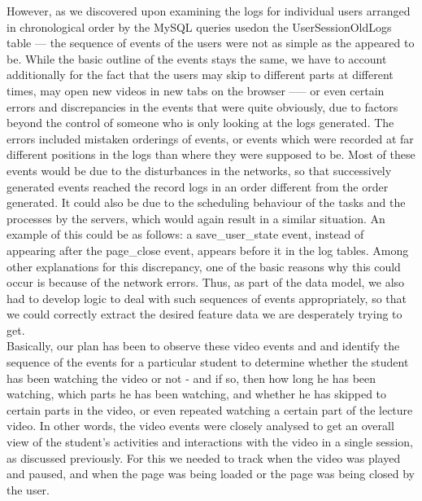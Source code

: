 \documentclass[16pt]{report}
\begin{document}
However, as we discovered upon examining the logs for individual users arranged in chronological order by the MySQL queries usedon the UserSessionOldLogs table --- the sequence of events of the users were not as simple as the appeared to be. While the basic outline of the events stays the same, we have to account additionally for the fact that the users may skip to different parts at different times, may open new videos in new tabs on the browser ----- or even certain errors and discrepancies in the events that were quite obviously, due to factors beyond the control of someone who is only looking at the logs generated. The errors included mistaken orderings of events, or events which were recorded at far different positions in the logs than where they were supposed to be. Most of these events would be due to the disturbances in the networks, so that successively generated events reached the record logs in an order different from the order generated. It could also be due to the scheduling behaviour of the tasks and the processes by the servers, which would again result in a similar situation. An example of this could be as follows: a save\_user\_state event, instead of appearing after the page\_close event, appears before it in the log tables. Among other explanations for this discrepancy, one of the basic reasons why this could occur is because of the network errors. Thus, as part of the data model, we also had to develop logic to deal with such sequences of events appropriately, so that we could correctly extract the desired feature data we are desperately trying to get.\\

Basically, our plan has been to observe these video events and and identify the sequence of the events for a particular student to determine whether the student has been watching the video or not - and if so, then how long he has been watching, which parts he has been watching, and whether he has skipped to certain parts in the video, or even repeated watching a certain part of the lecture video. In other words, the video events were closely analysed to get an overall view of the student's activities and interactions with the video in a single session, as discussed previously. For this we needed to track when the video was played and paused, and when the page was being loaded or the page was being closed by the user. \\
\end{document}

